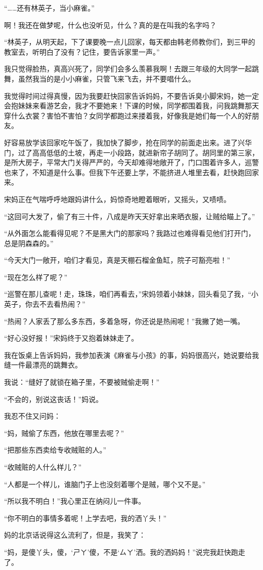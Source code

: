 \par “……还有林英子，当小麻雀。”
\par 啊！我还在做梦呢，什么也没听见，什么？真的是在叫我的名字吗？
\par “林英子，从明天起，下了课要晚一点儿回家，每天都由韩老师教你们，到三甲的教室去，听明白了没有？记住，要告诉家里一声。”
\par 我只觉得脸热，真高兴死了，同学们会多么羡慕我啊！去跟三年级的大同学一起跳舞，虽然我当的是小小麻雀，只管飞来飞去，并不要唱什么。
\par 我觉得时间过得真慢，因为我要赶快回家告诉妈妈，不要告诉臭小脚宋妈，她一定会抱妹妹来看游艺会，我才不要她来！下课的时候，同学都围着我，问我跳舞那天穿什么衣裳？害怕不害怕？女同学都跑过来搂着我，好像我是她们每一个人的好朋友。
\par 好容易放学该回家吃午饭了，我加快了脚步，抢在同学的前面走出来。进了兴华门，过了高高低低的土坡，再走一小段路，就进新帘子胡同了。胡同里的第三家，是所大房子，平常大门关得严严的，今天却难得地敞开了，门口围着许多人，巡警也来了，不知道是什么事。但我下午还要上学，不能挤进人堆里去看，赶快跑回家来。
\par 宋妈正在气喘呼呼地跟妈讲什么，妈惊奇地瞪着眼听，又摇头，又啧啧。
\par “这回可大发了，偷了有三十件，八成是昨天天好拿出来晒衣服，让贼给瞄上了。”
\par “从外面怎么能看得见呢？不是黑大门的那家吗？我路过也难得看见他们打开门，总是阴森森的。”
\par “今天大门一敞开，咱们才看见，真是天棚石榴金鱼缸，院子可豁亮啦！”
\par “现在怎么样了呢？”
\par “巡警在那儿查呢！走，珠珠，咱们再看去，”宋妈领着小妹妹，回头看见了我，“小英子，你去不去看热闹？”
\par “热闹？人家丢了那么多东西，多着急呀，你还说是热闹呢！”我撇了她一嘴。
\par “好心没好报！”宋妈终于又抱着妹妹走了。
\par 我在饭桌上告诉妈妈，我参加表演《麻雀与小孩》的事，妈妈很高兴，她说要给我缝一件最漂亮的跳舞衣。
\par 我说：“缝好了就锁在箱子里，不要被贼偷走啊！”
\par “不会的，别说这丧话！”妈说。
\par 我忍不住又问妈：
\par “妈，贼偷了东西，他放在哪里去呢？”
\par “把那些东西卖给专收贼赃的人。”
\par “收贼赃的人什么样儿？”
\par “人都是一个样儿，谁脑门子上也没刻着哪个是贼，哪个又不是。”
\par “所以我不明白！”我心里正在纳闷儿一件事。
\par “你不明白的事情多着呢！上学去吧，我的洒丫头！”
\par 妈的北京话说得这么流利了，但是，我笑了：
\par “妈，是傻丫头，傻，‘ㄕㄚ’傻，不是‘ㄙㄚ’洒。我的洒妈妈！”说完我赶快跑走了。



